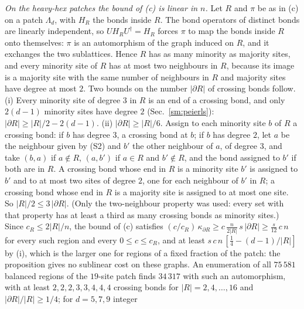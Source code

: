 \documentclass[aps,prx,onecolumn,10pt,nofootinbib,longbibliography,floatfix]{revtex4-2}
\theoremstyle{remark}
\begin{document}
\emph{On the heavy-hex patches the bound of (c) is linear in $n$.} Let $R$ and $\pi$ be as in (c) on a patch
$\Lambda_d$, with $H_R$ the bonds inside $R$. The bond operators of distinct bonds are linearly independent, so
$UH_RU^\dagger=H_R$ forces $\pi$ to map the bonds inside $R$ onto themselves: $\pi$ is an automorphism of the graph
induced on $R$, and it exchanges the two sublattices. Hence $R$ has as many minority as majority sites, and every
minority site of $R$ has at most two neighbours in $R$, because its image is a majority site with the same number
of neighbours in $R$ and majority sites have degree at most $2$. Two bounds on the number $|\partial R|$ of %
crossing bonds follow.
(i) Every minority site of degree $3$ in $R$ is an end of a crossing bond, and only $2(d-1)$ minority sites have %
degree $2$ (Sec.~\ref{sm:peierls}): $|\partial R|\ge|R|/2-2(d-1)$. %
(ii) $|\partial R|\ge|R|/6$. Assign to each minority site $b$ of $R$ a crossing bond: if $b$ has degree $3$, a %
crossing bond at $b$; if $b$ has degree $2$, let $a$ be the neighbour given by (S2) and $b'$ the other neighbour of %
$a$, of degree $3$, and take $(b,a)$ if $a\notin R$, $(a,b')$ if $a\in R$ and $b'\notin R$, and the bond assigned %
to $b'$ if both are in $R$. A crossing bond whose end in $R$ is a minority site $b'$ is assigned to $b'$ and to at
most two sites of degree $2$, one for each neighbour of $b'$ in $R$; a crossing bond whose end in $R$ is a %
majority site is assigned to at most one site. So $|R|/2\le3\,|\partial R|$. (Only the two-neighbour property was
used: every set with that property has at least a third as many crossing bonds as minority sites.)
Since $c_R\le2|R|/n$, the bound of (c) satisfies
$(c/c_R)\,\kappa_{\partial R}\ge c\,\frac{n}{2|R|}\,s\,|\partial R|\ge\frac{s}{12}\,c\,n$ for every such region and %
every $0\le c\le c_R$, and at least $s\,c\,n\,[\frac14-(d-1)/|R|]$ by (i), which is the larger one for regions of a
fixed fraction of the patch: the proposition gives no sublinear cost on these graphs. An enumeration of all
$75\,581$ balanced regions of the $19$-site patch finds $34\,317$ with such an automorphism, with at least %
$2,2,2,3,3,4,4,4$ crossing bonds for $|R|=2,4,\dots,16$ and $|\partial R|/|R|\ge1/4$; for $d=5,7,9$ integer %
\end{document}
